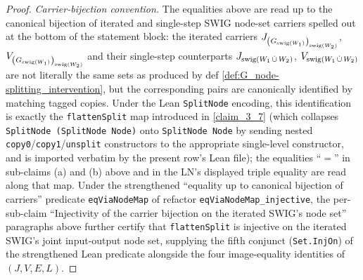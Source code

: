 \documentclass[main]{subfiles}
\begin{document}
\begin{proof}
\medskip\noindent\emph{Carrier-bijection convention.}
The equalities above are read up to the canonical bijection of iterated and single-step SWIG node-set carriers spelled out at the bottom of the statement block: the iterated carriers $J_{\left ( G_{\mathrm{swig}(W_1)} \right )_{\mathrm{swig}(W_2)}}$, $V_{\left ( G_{\mathrm{swig}(W_1)} \right )_{\mathrm{swig}(W_2)}}$ and their single-step counterparts $J_{\mathrm{swig}(W_1 \,\dot{\cup}\, W_2)}$, $V_{\mathrm{swig}(W_1 \,\dot{\cup}\, W_2)}$ are not literally the same sets as produced by def \ref{def:G_node-splitting_intervention}, but the corresponding pairs are canonically identified by matching tagged copies. Under the Lean \texttt{SplitNode} encoding, this identification is exactly the \texttt{flattenSplit} map introduced in \ref{claim_3_7} (which collapses \texttt{SplitNode (SplitNode Node)} onto \texttt{SplitNode Node} by sending nested \texttt{copy0}/\texttt{copy1}/\texttt{unsplit} constructors to the appropriate single-level constructor, and is imported verbatim by the present row's Lean file); the equalities ``$=$'' in sub-claims (a) and (b) above and in the LN's displayed triple equality are read along that map. Under the strengthened ``equality up to canonical bijection of carriers'' predicate \texttt{eqViaNodeMap} of refactor \texttt{eqViaNodeMap\_injective}, the per-sub-claim ``Injectivity of the carrier bijection on the iterated SWIG's node set'' paragraphs above further certify that \texttt{flattenSplit} is injective on the iterated SWIG's joint input-output node set, supplying the fifth conjunct (\texttt{Set.InjOn}) of the strengthened Lean predicate alongside the four image-equality identities of $(J, V, E, L)$.
\end{proof}
\end{document}
